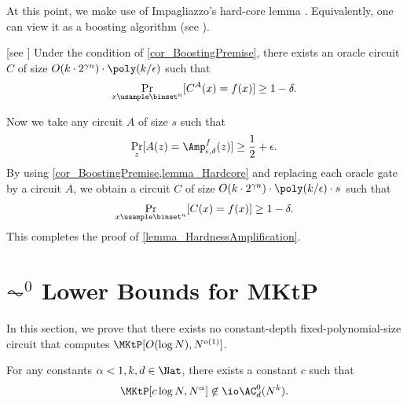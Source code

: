\documentclass{toc}
\begin{document}
At this point, we make use of Impagliazzo's hard-core lemma \cite{Impagliazzo95_coco_conf}.
Equivalently, one can view it as a boosting algorithm
%
(see \cite{KlivansS03_ml_journals}).   %
\begin{lemma}
  [see   %
    \cite{Impagliazzo95_coco_conf, KlivansS03_ml_journals}]
  \label{lemma_Hardcore}
  Under the condition of \cref{cor_BoostingPremise},
  there exists an oracle circuit $C$ of size $O(k \cdot 2^{\gamma n}) \cdot \poly(k / \epsilon)$
  such that
  $$
    \Pr_{x \usample \binset^n} [ C^A(x) = f(x) ] \ge 1 - \delta.
  $$
\end{lemma}

Now we take any circuit $A$ of size $s$ such that
$$
  \Pr_{z} [  A(z) = \Amp_{\epsilon, \delta}^f(z) ] \ge \frac{1}{2} + \epsilon.
$$
By using \cref{cor_BoostingPremise,lemma_Hardcore}
and replacing each oracle gate by a circuit $A$,
we obtain a circuit $C$ of size $O(k \cdot 2^{\gamma n}) \cdot \poly(k / \epsilon) \cdot s$
such that
$$
  \Pr_{x \usample \binset^n} [ C(x) = f(x) ] \ge 1 - \delta.
$$
This completes the proof of \cref{lemma_HardnessAmplification}.

\section{\texorpdfstring{$\AC^0$}{AC0} Lower Bounds for MKtP}
\label{section_AC0MKtP}

In this section, we prove that there exists no constant-depth fixed-polynomial-size circuit that computes $\MKtP[O(\log N), N^{o(1)}]$.
\begin{proposition}
  \label{prop_AC0versusMKtP}
  For any constants $\alpha < 1, k, d \in \Nat$,
  there exists a constant $c$ such that
  $$\MKtP[c \log N, N^{\alpha}] \not\in \io \AC_d^0(N^k).$$
\end{proposition}
\end{document}

